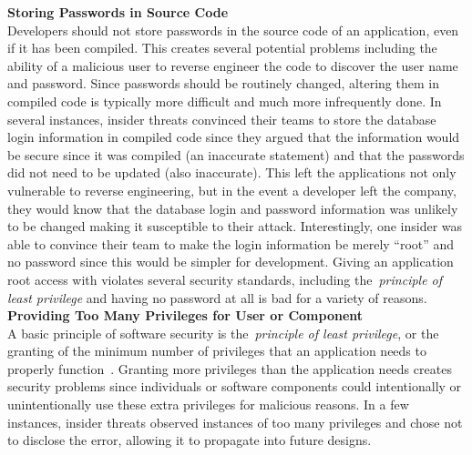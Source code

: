 \documentclass[conference]{IEEEtran}
\begin{document}
\textbf{Storing Passwords in Source Code}\\
Developers should not store passwords in the source code of an application, even if it has been compiled. This creates several potential problems including the ability of a malicious user to reverse engineer the code to discover the user name and password. Since passwords should be routinely changed, altering them in compiled code is typically more difficult and much more infrequently done. In several instances, insider threats convinced their teams to store the database login information in compiled code since they argued that the information would be secure since it was compiled (an inaccurate statement) and that the passwords did not need to be updated (also inaccurate). This left the applications not only vulnerable to reverse engineering, but in the event a developer left the company, they would know that the database login and password information was unlikely to be changed making it susceptible to their attack. Interestingly, one insider was able to convince their team to make the login information be merely ``root'' and no password since this would be simpler for development. Giving an application root access with violates several security standards, including the~\emph{principle of least privilege} and having no password at all is bad for a variety of reasons. \\


\textbf{Providing Too Many Privileges for User or Component}\\
A basic principle of software security is the~\emph{principle of least privilege}, or the granting of the minimum number of privileges that an application needs to properly function~\cite{saltzer1975protection}. Granting more privileges than the application needs creates security problems since individuals or software components could intentionally or unintentionally use these extra privileges for malicious reasons.  In a few instances, insider threats observed instances of too many privileges and chose not to disclose the error, allowing it to propagate into future designs. \\



\end{document}
